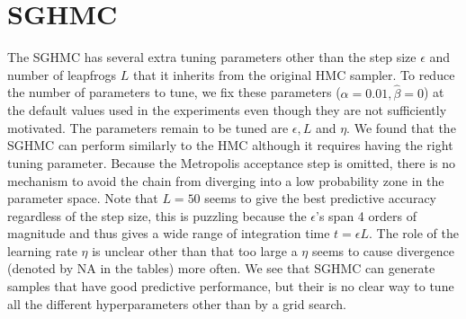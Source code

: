 \documentclass[12pt]{report}
\begin{document}
\section{SGHMC}
The SGHMC has several extra tuning parameters other than the step size $\epsilon$ and number of leapfrogs $L$ that it inherits from the original HMC sampler. To reduce the number of parameters to tune, we fix these parameters ($\alpha=0.01, \hat{\beta}=0$) at the default values used in the experiments even though they are not sufficiently motivated. The parameters remain to be tuned are $\epsilon,L $ and $\eta$. We found that the SGHMC can perform similarly to the HMC although it requires having the right tuning parameter. Because the Metropolis acceptance step is omitted, there is no mechanism to avoid the chain from diverging into a low probability zone in the parameter space. Note that $L=50$ seems to give the best predictive accuracy regardless of the step size, this is puzzling because the $\epsilon$'s span 4 orders of magnitude and thus gives a wide range of integration time $t = \epsilon L$. The role of the learning rate $\eta$ is unclear other than that too large a $\eta$ seems to cause divergence (denoted by NA in the tables) more often. We see that SGHMC can generate samples that have good predictive performance, but their is no clear way to tune all the different hyperparameters other than by a grid search.
\end{document}
